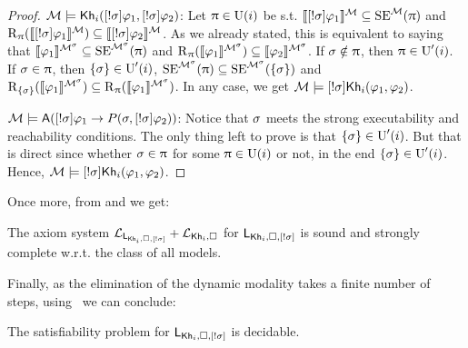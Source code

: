 \begin{proof}
  $\modults \models \khi(\srefbox{\plan} \varphi_1,\srefbox{\plan} \varphi_2)$: Let $\plans \in \Unc(i)$ be s.t. $\truthset{\modults}{\srefbox{\plan}\varphi_1} \subseteq \stexec^\modults(\plans)$ and $\R_\plans(\truthset{\modults}{\srefbox{\plan}\varphi_1}) \subseteq \truthset{\modults}{\srefbox{\plan}\varphi_2}$.
As we already stated, this is equivalent to saying that $\truthset{\modults^\plan}{\varphi_1} \subseteq \stexec^{\modults^\plan}(\plans)$ and $\R_\plans(\truthset{\modults^\plan}{\varphi_1}) \subseteq \truthset{\modults^\plan}{\varphi_2}$.
If $\plan \notin \plans$, then $\plans \in \Unc'(i)$.
If $\plan \in \plans$, then $\set{\plan} \in \Unc'(i)$, $\stexec^{\modults^\plan}(\plans) \subseteq \stexec^{\modults^\plan}(\set{\plan})$ and $\R_{\set{\plan}}(\truthset{\modults^\plan}{\varphi_1}) \subseteq \R_\plans(\truthset{\modults^\plan}{\varphi_1})$. In any case, we get $\modults \models \srefbox{\plan}\khi(\varphi_1,\varphi_2)$.

$\modults \models \A(\srefbox{\plan} \varphi_1 \ra P(\plan,\srefbox{\plan}\varphi_2))$: Notice that $\plan$ meets the strong executability and reachability conditions.
The only thing left to prove is that $\set{\plan} \in \Unc'(i)$. But that is direct since whether $\plan \in \plans$ for some $\plans \in \Unc(i)$ or not, in the end $\set{\plan} \in \Unc'(i)$. Hence, $\modults \models \srefbox{\plan}\khi(\varphi_1,\varphi_2)$.
\end{proof}

Once more, from  and  we get:

\medskip 

\begin{theorem}
The axiom system $\axset_{\PlanReflogic}+\axset_{\khi,\square}$ for $\PlanReflogic$ is sound and strongly complete w.r.t. the class of all models.
\end{theorem}

\medskip 


Finally, as the elimination of the dynamic modality takes a finite number of steps, using~ we can conclude:

\medskip 

\begin{corollary}
The satisfiability problem for $\PlanReflogic$ is decidable.
\end{corollary} 

\medskip 

